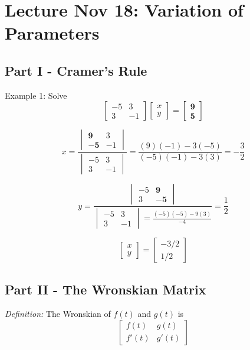 \documentclass[12pt]{article}
\begin{document}
\section{Lecture Nov 18: Variation of Parameters}
\subsection*{Part I - Cramer's Rule}
Example 1: Solve 
\[\begin{bmatrix}
    -5 & 3\\
    3 & -1
\end{bmatrix} \begin{bmatrix}
    x\\y
\end{bmatrix} = \begin{bmatrix}
    \mathbf{9}\\\mathbf{5}
\end{bmatrix}\]

\[x = \frac{\begin{vmatrix}
    \mathbf{9} & 3\\
    \mathbf{-5} & -1
\end{vmatrix}}{\begin{vmatrix}
    -5 & 3\\
    3 & -1
\end{vmatrix}} = \frac{(9)(-1) - 3(-5)}{(-5)(-1) - 3(3)} = -\frac{3}{2}\]

\[y = \frac{\begin{vmatrix}
    -5 & \mathbf{9}\\
    3 & \mathbf{-5}
\end{vmatrix}}{\begin{vmatrix}
    -5 & 3\\
    3 & -1
\end{vmatrix} = \frac{(-5)(-5) - 9(3)}{-4}} = \frac{1}{2}\]

\[\begin{bmatrix}
    x\\y
\end{bmatrix} = \begin{bmatrix}
    -3/2\\
    1/2
\end{bmatrix}\]

\subsection*{Part II - The Wronskian Matrix}
\emph{Definition:} The Wronskian of $f(t)$ and $g(t)$ is 
\[\begin{bmatrix}
    f(t) & g(t)\\
    f'(t) & g'(t)
\end{bmatrix}\]
\end{document}
